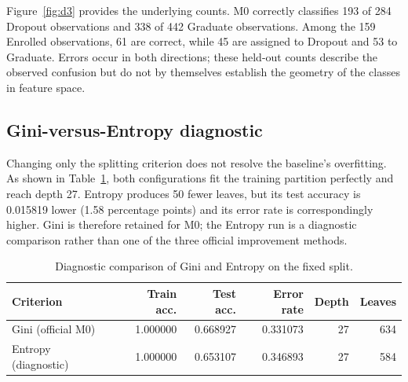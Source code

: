 Figure~\ref{fig:d3} provides the underlying counts. M0 correctly classifies
193 of 284 Dropout observations and 338 of 442 Graduate observations. Among
the 159 Enrolled observations, 61 are correct, while 45 are assigned to
Dropout and 53 to Graduate. Errors occur in both directions; these held-out
counts describe the observed confusion but do not by themselves establish
the geometry of the classes in feature space.

\subsection{Gini-versus-Entropy diagnostic}

Changing only the splitting criterion does not resolve the baseline's
overfitting. As shown in Table~\ref{tab:d-criterion}, both configurations fit
the training partition perfectly and reach depth 27. Entropy produces 50 fewer
leaves, but its test accuracy is 0.015819 lower (1.58 percentage points) and its
error rate is correspondingly higher. Gini is therefore retained for M0; the
Entropy run is a diagnostic comparison rather than one of the three official
improvement methods.

\begin{table}[H]
  \centering
  \caption{Diagnostic comparison of Gini and Entropy on the fixed split.}
  \label{tab:d-criterion}
  \begin{tabular}{@{}lrrrrr@{}}
    \toprule
    Criterion & Train acc. & Test acc. & Error rate & Depth & Leaves \\
    \midrule
    Gini (official M0) & 1.000000 & 0.668927 & 0.331073 & 27 & 634 \\
    Entropy (diagnostic) & 1.000000 & 0.653107 & 0.346893 & 27 & 584 \\
    \bottomrule
  \end{tabular}
\end{table}

